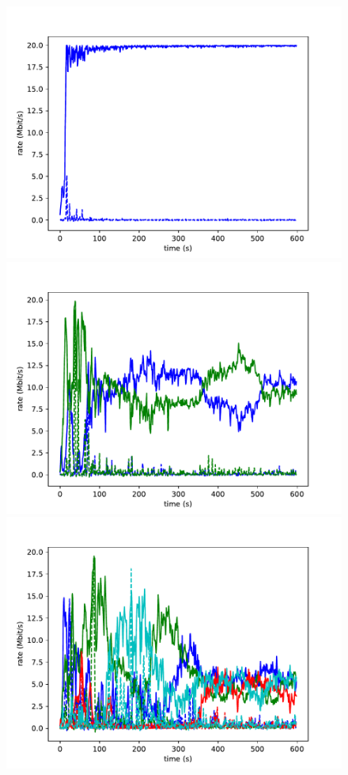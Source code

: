 \documentclass[sigconf]{acmart}
\begin{document}
\begin{figure}
\begin{minipage}{\columnwidth}
\includegraphics[width=\columnwidth]{figures/1_4}
\includegraphics[width=\columnwidth]{figures/2_2}
\includegraphics[width=\columnwidth]{figures/4_1}

\end{minipage}
\end{figure}
\end{document}
